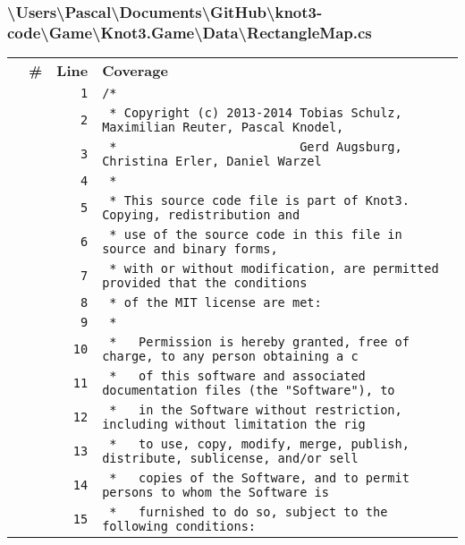 \documentclass[a4paper,10pt]{article}
\begin{document}
\subsubsection{\textbackslash Users\textbackslash Pascal\textbackslash Documents\textbackslash GitHub\textbackslash knot3-code\textbackslash Game\textbackslash Knot3.Game\textbackslash Data\textbackslash RectangleMap.cs}
\begin{longtable}[l]{lrrl}
\textbf{} & \textbf{\#} & \textbf{Line} & \textbf{Coverage}\\
\cellcolor{gray} &  & \verb~1~ & \verb~/*~\\
\cellcolor{gray} &  & \verb~2~ & \verb~ * Copyright (c) 2013-2014 Tobias Schulz, Maximilian Reuter, Pascal Knodel,~\\
\cellcolor{gray} &  & \verb~3~ & \verb~ *                         Gerd Augsburg, Christina Erler, Daniel Warzel~\\
\cellcolor{gray} &  & \verb~4~ & \verb~ *~\\
\cellcolor{gray} &  & \verb~5~ & \verb~ * This source code file is part of Knot3. Copying, redistribution and~\\
\cellcolor{gray} &  & \verb~6~ & \verb~ * use of the source code in this file in source and binary forms,~\\
\cellcolor{gray} &  & \verb~7~ & \verb~ * with or without modification, are permitted provided that the conditions~\\
\cellcolor{gray} &  & \verb~8~ & \verb~ * of the MIT license are met:~\\
\cellcolor{gray} &  & \verb~9~ & \verb~ *~\\
\cellcolor{gray} &  & \verb~10~ & \verb~ *   Permission is hereby granted, free of charge, to any person obtaining a c~\\
\cellcolor{gray} &  & \verb~11~ & \verb~ *   of this software and associated documentation files (the "Software"), to ~\\
\cellcolor{gray} &  & \verb~12~ & \verb~ *   in the Software without restriction, including without limitation the rig~\\
\cellcolor{gray} &  & \verb~13~ & \verb~ *   to use, copy, modify, merge, publish, distribute, sublicense, and/or sell~\\
\cellcolor{gray} &  & \verb~14~ & \verb~ *   copies of the Software, and to permit persons to whom the Software is~\\
\cellcolor{gray} &  & \verb~15~ & \verb~ *   furnished to do so, subject to the following conditions:~\\

\end{longtable}
\end{document}
